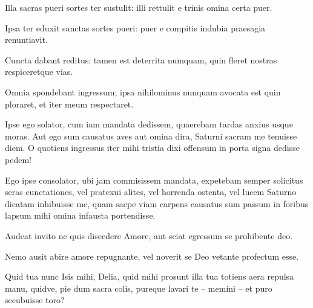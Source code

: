 {\large

\noindent Illa sacras pueri sortes ter sustulit: illi rettulit e trinis omina certa puer.\\

}


\noindent Ipsa ter eduxit sanctas sortes pueri: puer e compitis indubia praesagia renuntiavit.\\

{\large

\noindent Cuncta dabant reditus: tamen est deterrita numquam, quin fleret nostras respiceretque vias.\\

}


\noindent Omnia spondebant ingressum; ipsa nihilominus nunquam avocata est quin ploraret, et iter meum respectaret. \\

\newpage

{\large

\noindent Ipse ego solator, cum iam mandata dedissem, quaerebam tardas anxius usque moras. Aut ego sum causatus aves aut omina dira, Saturni sacram me tenuisse diem. O quotiens ingressus iter mihi tristia dixi offensum in porta signa dedisse pedem!\\

}


\noindent Ego ipse consolator, ubi jam commisissem mandata, expetebam semper solicitus seras cunctationes, vel pratexui alites, vel horrenda ostenta, vel lucem Saturno dicatam inhibuisse me, quam saepe viam carpens causatus sum passum in foribus lapsum mihi omina infausta portendisse. \\





{\large

\noindent Audeat invito ne quis discedere Amore, aut sciat egressum se prohibente deo.\\

}


\noindent Nemo ausit abire amore repugnante, vel noverit se Deo vetante profectum esse. \\

{\large

\noindent Quid tua nunc Isis mihi, Delia, quid mihi prosunt illa tua totiens aera repulsa manu, quidve, pie dum sacra colis, pureque lavari te – memini – et puro secubuisse toro?\\

}


